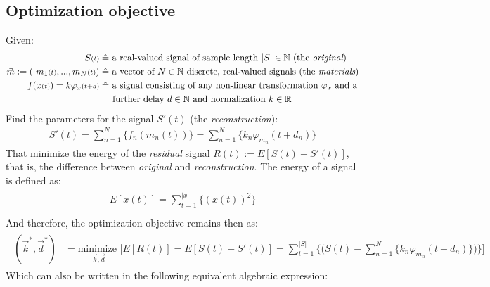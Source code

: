 \documentclass[11pt]{scrartcl} %
\begin{document}
\subsection*{Optimization objective}
Given:
\begin{align*}
    \begin{aligned}
      S{\scriptstyle (t)} \;&\hat{=} \text{ a real-valued signal of sample length } |S| \in \mathbb{N} \text{ (the {\it original})}\\
      \vec{m} := (\ m_1{\scriptstyle (t)}, ..., m_N{\scriptstyle (t)}) \;&\hat{=} \text{ a vector of \(N\in\mathbb{N}\) discrete, real-valued signals (the {\it materials})}\\
      f(x{\scriptstyle (t)}) = k
      \varphi_x{\scriptstyle (t+d)} \;&\hat{=} \text{ a signal consisting of any non-linear transformation } \varphi_x \text{ and a}\\
        &\phantom{\quad\,}\text{further delay } d\in\mathbb{N} \text{ and normalization } k\in\mathbb{R} \notag\\ %
    \end{aligned}
\end{align*}
Find the parameters for the signal \(S'{\scriptstyle (t)}\) (the {\it reconstruction}):
  \begin{align*}
    S'{\scriptstyle (t)} = \sum_{n=1}^N\{f_n(m_n{\scriptstyle (t)})\} = \sum_{n=1}^N\{k_n\varphi_{m_n}{\scriptstyle (t+d_n)}\}
  \end{align*}
  That minimize the energy of the {\it residual} signal \(R{\scriptstyle (t)} := E[S{\scriptstyle (t)}-S'{\scriptstyle (t)}]\), that is, the difference between  {\it original} and {\it reconstruction}. The energy of a signal is defined as:
  \begin{align*}
    \begin{aligned}
      E[x{\scriptstyle (t)}] = \sum_{t=1}^{|x|}\{(x{\scriptstyle (t)})^2\}\\[15pt]
    \end{aligned}
  \end{align*}
  And therefore, the optimization objective remains then as:
  \begin{align*}
    \begin{aligned}
      (\vec{k}^*, \vec{d}^*) &= \underset{\vec{k}, \vec{d}}{\text{minimize }}\Bigg[
      E[R{\scriptstyle (t)}] = E[S{\scriptstyle (t)}-S'{\scriptstyle (t)}]
      = \sum_{t=1}^{|S|}\bigg\{\Big(S{\scriptstyle (t)}-\sum_{n=1}^N\{k_n\varphi_{m_n}{\scriptstyle (t+d_n)}\}\Big) \bigg\} \Bigg]
    \end{aligned}
  \end{align*}
  Which can also be written in the following equivalent algebraic expression:
  
\end{document}
